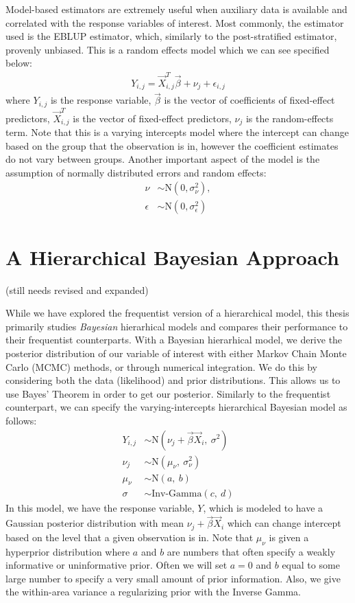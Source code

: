 \documentclass[12pt,twoside]{reedthesis}
\begin{document}
Model-based estimators are extremely useful when auxiliary data is available and correlated with the response variables of interest. Most commonly, the estimator used is the EBLUP estimator, which, similarly to the post-stratified estimator, provenly unbiased. This is a random effects model which we can see specified below:
\begin{align}
Y_{i,j} = \vec X_{i,j}^{T}\vec\beta + \nu_j + \epsilon_{i,j}
\end{align}
where \(Y_{i,j}\) is the response variable, \(\vec\beta\) is the vector of coefficients of fixed-effect predictors, \(\vec X_{i,j}^{T}\) is the vector of fixed-effect predictors, \(\nu_j\) is the random-effects term. Note that this is a varying intercepts model where the intercept can change based on the group that the observation is in, however the coefficient estimates do not vary between groups. Another important aspect of the model is the assumption of normally distributed errors and random effects:
\begin{align}
\nu &\sim \text{N}(0, \sigma^2_{\nu}), \\
\epsilon &\sim \text{N}(0, \sigma^2_{\epsilon})
\end{align}
\hypertarget{a-hierarchical-bayesian-approach}{%
\section{A Hierarchical Bayesian Approach}\label{a-hierarchical-bayesian-approach}}

(still needs revised and expanded)

While we have explored the frequentist version of a hierarchical model, this thesis primarily studies \emph{Bayesian} hierarhical models and compares their performance to their frequentist counterparts. With a Bayesian hierarhical model, we derive the posterior distribution of our variable of interest with either Markov Chain Monte Carlo (MCMC) methods, or through numerical integration. We do this by considering both the data (likelihood) and prior distributions. This allows us to use Bayes' Theorem in order to get our posterior. Similarly to the frequentist counterpart, we can specify the varying-intercepts hierarchical Bayesian model as follows:
\begin{align}
Y_{i,j} &\sim \text{N}(\nu_j + \vec\beta\vec X_i,~ \sigma^2) \\
\nu_j &\sim \text{N}(\mu_\nu,~ \sigma^2_\nu) \\
\mu_\nu &\sim \text{N}(a,~b) \\
\sigma &\sim \text{Inv-Gamma}(c,~d)
\end{align}
In this model, we have the response variable, \(Y\), which is modeled to have a Gaussian posterior distribution with mean \(\nu_j + \vec\beta\vec X_i\) which can change intercept based on the level that a given observation is in. Note that \(\mu_\nu\) is given a hyperprior distribution where \(a\) and \(b\) are numbers that often specify a weakly informative or uninformative prior. Often we will set \(a=0\) and \(b\) equal to some large number to specify a very small amount of prior information. Also, we give the within-area variance a regularizing prior with the Inverse Gamma.
\end{document}
